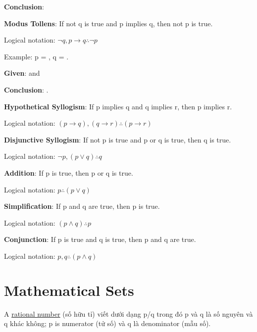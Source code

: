 \textbf{Conclusion}: 

\vspace{4 mm}

\textbf{Modus Tollens}: If not q is true and p implies q, then not p is true.

Logical notation: \(\neg q, p \rightarrow q \therefore \neg p\)

Example: p = , q = .

\textbf{Given}:  and 

\textbf{Conclusion}: .

\vspace{10 mm}

\textbf{Hypothetical Syllogism}: If p implies q and q implies r, then p implies r.

Logical notation: \((p \rightarrow q), (q \rightarrow r) \therefore (p \rightarrow r)\)

\vspace{4 mm}

\textbf{Disjunctive Syllogism}: If not p is true and p or q is true, then q is true.

Logical notation: \(\neg p, (p \vee q) \therefore q\)

\vspace{10 mm}

\textbf{Addition}: If p is true, then p or q is true.

Logical notation: \(p \therefore (p \vee q)\)

\vspace{4 mm}

\textbf{Simplification}: If p and q are true, then p is true.

Logical notation: \((p \wedge q) \therefore p\)

\vspace{4 mm}

\textbf{Conjunction}: If p is true and q is true, then p and q are true.

Logical notation: \(p,q \therefore (p \wedge q)\)

\section{Mathematical Sets}

A \href{https://en.wikipedia.org/wiki/Rational_number}{rational number} (số hữu tỉ) viết dưới dạng p/q trong đó p và q là số nguyên và q khác không; p is numerator (tử số) và q là denominator (mẫu số).

